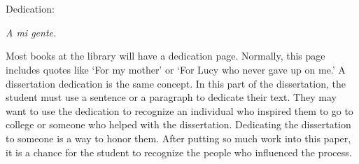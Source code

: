 \chapter*{\phantom{Dedication}}

Dedication:

\hfil \textit{A mi gente.} \hfil

Most books at the library will have a dedication page. Normally, this page includes quotes like `For my mother' or `For Lucy who never gave up on me.' A dissertation dedication is the same concept. In this part of the dissertation, the student must use a sentence or a paragraph to dedicate their text. They may want to use the dedication to recognize an individual who inspired them to go to college or someone who helped with the dissertation. Dedicating the dissertation to someone is a way to honor them. After putting so much work into this paper, it is a chance for the student to recognize the people who influenced the process.
